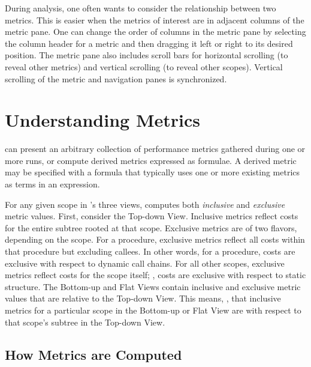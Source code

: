 During analysis, one often wants to consider the relationship between two metrics.
This is easier when the metrics of interest are in adjacent columns of the metric pane.
One can change the order of columns in the metric pane by selecting the column header for a metric and then dragging it left or right to its desired position.
The metric pane also includes scroll bars for horizontal scrolling (to reveal other metrics) and vertical scrolling (to reveal other scopes).
Vertical scrolling of the metric and navigation panes is synchronized.





\section{Understanding Metrics}

\hpcviewer{} can present an arbitrary collection of performance metrics gathered during one or more runs, or compute derived metrics expressed as formulae. A derived metric may be specified with a formula that typically uses one or more existing metrics as terms in an expression.

For any given scope in \hpcviewer{}'s three views, \hpcviewer{} computes both \emph{inclusive} and \emph{exclusive} metric values.
First, consider the Top-down View.
Inclusive metrics reflect costs for the entire subtree rooted at that scope.
Exclusive metrics are of two flavors, depending on the scope.
For a procedure, exclusive metrics reflect all costs within that procedure but excluding callees.
In other words, for a procedure, costs are exclusive with respect to dynamic call chains.
For all other scopes, exclusive metrics reflect costs for the scope itself; \ie{}, costs are exclusive with respect to static structure.
The Bottom-up and Flat Views contain inclusive and exclusive metric values that are relative to the Top-down View.
This means, \eg{}, that inclusive metrics for a particular scope in the Bottom-up or Flat View are with respect to that scope's subtree in the Top-down View.



\subsection{How Metrics are Computed}

